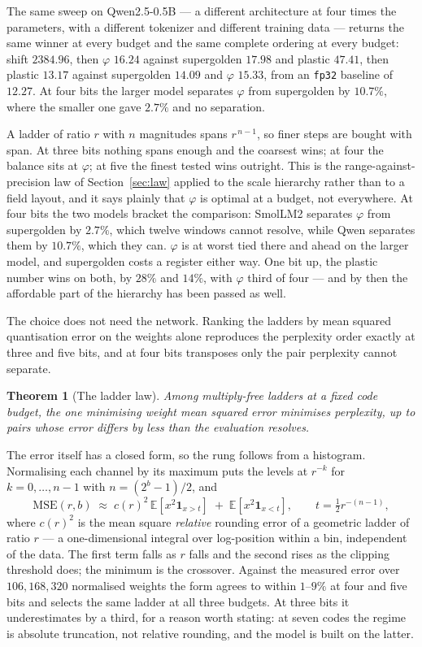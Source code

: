 \documentclass[11pt]{article}
\newtheorem{theorem}{Theorem}
\theoremstyle{definition}
\begin{document}
The same sweep on Qwen2.5-0.5B --- a different architecture at four times the
parameters, with a different tokenizer and different training data --- returns
the same winner at every budget and the same complete ordering at every budget:
shift $2384.96$, then $\varphi$ $\mathbf{16.24}$ against supergolden $17.98$ and
plastic $47.41$, then plastic $\mathbf{13.17}$ against supergolden $14.09$ and
$\varphi$ $15.33$, from an \texttt{fp32} baseline of $12.27$. At four bits the
larger model separates $\varphi$ from supergolden by $10.7\%$, where the smaller
one gave $2.7\%$ and no separation.

A ladder of ratio $r$ with $n$ magnitudes spans $r^{\,n-1}$, so finer steps are
bought with span. At three bits nothing spans enough and the coarsest wins; at
four the balance sits at $\varphi$; at five the finest tested wins outright.
This is the range-against-precision law of Section~\ref{sec:law} applied to the
scale hierarchy rather than to a field layout, and it says plainly that
$\varphi$ is optimal at a budget, not everywhere. At four bits the two models bracket the comparison: SmolLM2 separates
$\varphi$ from supergolden by $2.7\%$, which twelve windows cannot resolve,
while Qwen separates them by $10.7\%$, which they can. $\varphi$ is at worst
tied there and ahead on the larger model, and supergolden costs a register
either way. One bit up, the plastic number wins on both, by $28\%$ and $14\%$,
with $\varphi$ third of four --- and by then the affordable part of the
hierarchy has been passed as well.

The choice does not need the network. Ranking the ladders by mean squared
quantisation error on the weights alone reproduces the perplexity order exactly
at three and five bits, and at four bits transposes only the pair perplexity
cannot separate.

\begin{theorem}[The ladder law]\label{thm:ladder}
Among multiply-free ladders at a fixed code budget, the one minimising weight
mean squared error minimises perplexity, up to pairs whose error differs by less
than the evaluation resolves.
\end{theorem}

The error itself has a closed form, so the rung follows from a histogram.
Normalising each channel by its maximum puts the levels at $r^{-k}$ for
$k=0,\dots,n-1$ with $n=(2^{b}-1)/2$, and
\[
  \mathrm{MSE}(r,b)\;\approx\;c(r)^{2}\,\mathbb{E}\!\left[x^{2}\mathbf{1}_{x>t}\right]
  \;+\;\mathbb{E}\!\left[x^{2}\mathbf{1}_{x<t}\right],\qquad t=\tfrac12 r^{-(n-1)},
\]
where $c(r)^2$ is the mean square \emph{relative} rounding error of a geometric
ladder of ratio $r$ --- a one-dimensional integral over log-position within a
bin, independent of the data. The first term falls as $r$ falls and the second
rises as the clipping threshold does; the minimum is the crossover. Against the
measured error over $106{,}168{,}320$ normalised weights the form agrees to
within $1$--$9\%$ at four and five bits and selects the same ladder at all three
budgets. At three bits it underestimates by a third, for a reason worth stating:
at seven codes the regime is absolute truncation, not relative rounding, and the
model is built on the latter.
\end{document}
